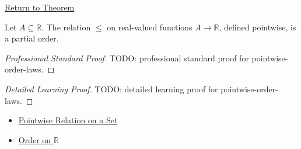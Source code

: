 \newpage
{}
\label{prf:pointwise-order-laws}

\begin{remark*}[Return]
\hyperref[thm:pointwise-order-laws]{Return to Theorem}
\end{remark*}

\begin{theorem*}
Let \(A\subseteq\mathbb{R}\).  The relation \(\leq\) on real-valued
functions \(A\to\mathbb{R}\), defined pointwise, is a partial order.
\end{theorem*}

\begin{proof}[Professional Standard Proof]
\LRAProofBodyStart
TODO: professional standard proof for pointwise-order-laws.
\end{proof}

\begin{proof}[Detailed Learning Proof]
\LRAProofBodyStart
TODO: detailed learning proof for pointwise-order-laws.
\end{proof}

\begin{remark*}
\end{remark*}

\begin{dependencies}
\begin{itemize}
  \item \hyperref[def:pointwise-relation-on-set]{Pointwise Relation on a Set}
  \item \hyperref[def:order-on-r]{Order on \(\mathbb{R}\)}
\end{itemize}
\end{dependencies}

\clearpage
